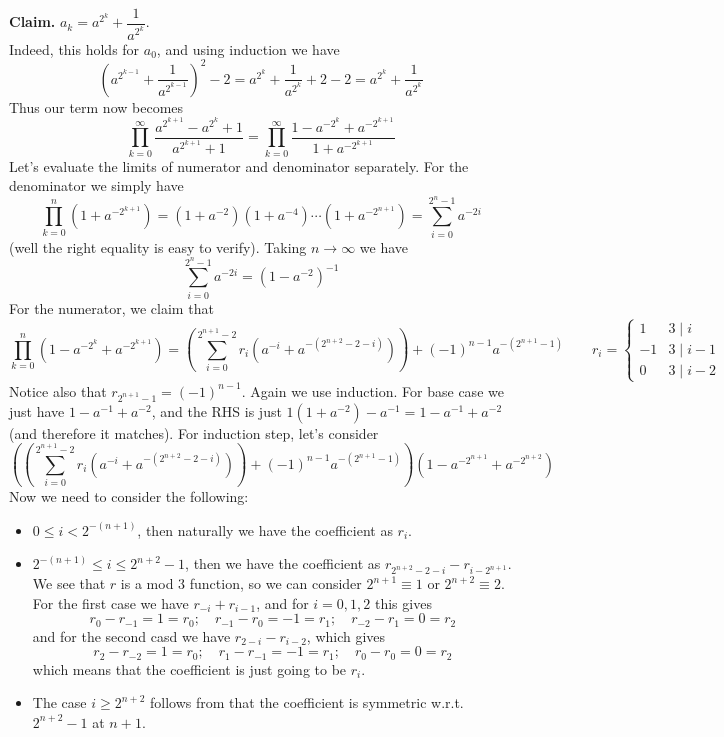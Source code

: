 \documentclass[11pt,a4paper]{article}
\newcommand{\<}{\langle}
\renewcommand{\>}{\rangle}
\begin{document}
\begin{enumerate}
	\textbf{Claim.} $a_k= a^{2^k}+\dfrac{1}{a^{2^k}}$. \\
	Indeed, this holds for $a_0$, and using induction we have 
	\[
	\left(a^{2^{k-1}}+\dfrac{1}{a^{2^{k-1}}}\right)^2-2
	=a^{2^k}+\dfrac{1}{a^{2^k}}+2-2
	=a^{2^k}+\dfrac{1}{a^{2^k}}
	\]
	Thus our term now becomes 
	\[
	\prod_{k=0}^{\infty}\frac{a^{2^{k+1}}-a^{2^k}+1}{a^{2^{k+1}}+1}
	=\prod_{k=0}^{\infty}\frac{1-a^{-2^k}+a^{-2^{k+1}}}{1+a^{-2^{k+1}}}
	\]
	Let's evaluate the limits of numerator and denominator separately. 
	For the denominator we simply have 
	\[
	\prod_{k=0}^{n}(1+a^{-2^{k+1}})
	=(1+a^{-2})(1+a^{-4})\cdots (1+a^{-2^{n+1}})
	=\sum_{i=0}^{2^n-1}a^{-2i}
	\]
	(well the right equality is easy to verify). 
	Taking $n\to\infty$ we have 
	\[
	\sum_{i=0}^{2^n-1}a^{-2i}=(1-a^{-2})^{-1}
	\]
	For the numerator, we claim that 
	\[
	\prod_{k=0}^{n}(1-a^{-2^k}+a^{-2^{k+1}})
	=\left(\sum_{i=0}^{2^{n+1}-2} r_i(a^{-i}+a^{-(2^{n+2}-2-i)})\right)
	+(-1)^{n-1}a^{-(2^{n+1}-1)}
	\qquad 
	r_i=
	\begin{cases}
	  1 & 3\mid i\\
	  -1 & 3\mid i - 1\\
	  0 & 3\mid i - 2
	\end{cases}
	\]
	Notice also that $r_{2^{n+1}-1}=(-1)^{n-1}$. 
	Again we use induction. 
	For base case we just have $1-a^{-1}+a^{-2}$, and the RHS is just 
	$1(1+a^{-2})-a^{-1}=1-a^{-1}+a^{-2}$ (and therefore it matches). 
	For induction step, let's consider 
	\[
	\left(\left(\sum_{i=0}^{2^{n+1}-2} r_i(a^{-i}+a^{-(2^{n+2}-2-i)})\right)
	+(-1)^{n-1}a^{-(2^{n+1}-1)}\right)\left(1-a^{-2^{n+1}}+a^{-2^{n+2}}\right)
	\]
	Now we need to consider the following: 
	\begin{itemize}
		\item $0\le i < 2^{-(n+1)}$, then naturally we have the coefficient as $r_i$. 
		
		\item $2^{-(n+1)}\le i \le 2^{n+2}-1$, 
		then we have the coefficient as $r_{2^{n+2}-2-i}-r_{i-2^{n+1}}$. 
		We see that $r$ is a mod 3 function, so we can consider $2^{n+1}\equiv 1$ or $2^{n+2}\equiv 2$. 
		For the first case we have $r_{-i}+r_{i-1}$, 
		and for $i=0, 1, 2$ this gives 
		\[r_0-r_{-1}=1=r_0; \quad r_{-1}-r_{0}=-1=r_1;  \quad r_{-2}-r_{1}=0=r_2
		\]
		and for the second casd we have $r_{2-i}-r_{i-2}$, which gives 
		\[
		r_2-r_{-2}=1=r_0; \quad r_{1}-r_{-1}=-1=r_1; \quad r_{0}-r_0 = 0 = r_2
		\]
		which means that the coefficient is just going to be $r_i$. 
		
		\item The case $i\ge 2^{n+2}$ follows from that the coefficient is symmetric w.r.t. $2^{n+2}-1$ at $n+1$. 
		

\end{itemize}
\end{enumerate}
\end{document}
